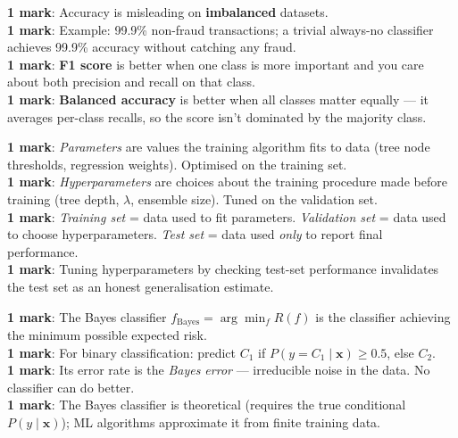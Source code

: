 \documentclass[11pt, a4paper]{article}
\begin{document}
\begin{exambox}
\textbf{1 mark}: Accuracy is misleading on \textbf{imbalanced} datasets. \\
\textbf{1 mark}: Example: 99.9\% non-fraud transactions; a trivial always-no classifier achieves 99.9\% accuracy without catching any fraud. \\
\textbf{1 mark}: \textbf{F1 score} is better when one class is more important and you care about both precision and recall on that class. \\
\textbf{1 mark}: \textbf{Balanced accuracy} is better when all classes matter equally — it averages per-class recalls, so the score isn't dominated by the majority class.
\end{exambox}

\begin{exambox}
\textbf{1 mark}: \emph{Parameters} are values the training algorithm fits to data (tree node thresholds, regression weights). Optimised on the training set. \\
\textbf{1 mark}: \emph{Hyperparameters} are choices about the training procedure made before training (tree depth, $\lambda$, ensemble size). Tuned on the validation set. \\
\textbf{1 mark}: \emph{Training set} = data used to fit parameters. \emph{Validation set} = data used to choose hyperparameters. \emph{Test set} = data used \emph{only} to report final performance. \\
\textbf{1 mark}: Tuning hyperparameters by checking test-set performance invalidates the test set as an honest generalisation estimate.
\end{exambox}

\begin{exambox}
\textbf{1 mark}: The Bayes classifier $f_{\text{Bayes}} = \arg\min_f R(f)$ is the classifier achieving the minimum possible expected risk. \\
\textbf{1 mark}: For binary classification: predict $C_1$ if $P(y = C_1 \mid \mathbf{x}) \ge 0.5$, else $C_2$. \\
\textbf{1 mark}: Its error rate is the \emph{Bayes error} — irreducible noise in the data. No classifier can do better. \\
\textbf{1 mark}: The Bayes classifier is theoretical (requires the true conditional $P(y \mid \mathbf{x})$); ML algorithms approximate it from finite training data.
\end{exambox}
\end{document}
